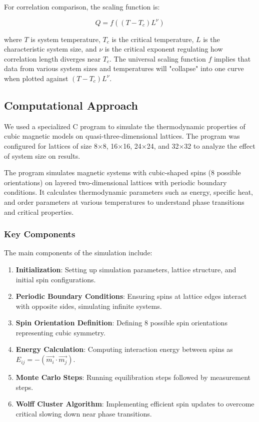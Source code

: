 \documentclass[conference, compsoc, twoside]{IEEEtran}
\begin{document}
For correlation comparison, the scaling function is:

\begin{equation}
Q = f((T - T_c)L^\nu)
\label{eq:correlation}
\end{equation}

where $T$ is system temperature, $T_c$ is the critical temperature, $L$ is the characteristic system size, and $\nu$ is the critical exponent regulating how correlation length diverges near $T_c$. The universal scaling function $f$ implies that data from various system sizes and temperatures will "collapse" into one curve when plotted against $(T - T_c)L^\nu$.

\subsection{Computational Approach}

We used a specialized C program to simulate the thermodynamic properties of cubic magnetic models on quasi-three-dimensional lattices. The program was configured for lattices of size 8×8, 16×16, 24×24, and 32×32 to analyze the effect of system size on results.

The program simulates magnetic systems with cubic-shaped spins (8 possible orientations) on layered two-dimensional lattices with periodic boundary conditions. It calculates thermodynamic parameters such as energy, specific heat, and order parameters at various temperatures to understand phase transitions and critical properties.

\subsubsection{Key Components}

The main components of the simulation include:

\begin{enumerate}
\item \textbf{Initialization}: Setting up simulation parameters, lattice structure, and initial spin configurations.
\item \textbf{Periodic Boundary Conditions}: Ensuring spins at lattice edges interact with opposite sides, simulating infinite systems.
\item \textbf{Spin Orientation Definition}: Defining 8 possible spin orientations representing cubic symmetry.
\item \textbf{Energy Calculation}: Computing interaction energy between spins as $E_{ij} = -(\vec{m_i} \cdot \vec{m_j})$.
\item \textbf{Monte Carlo Steps}: Running equilibration steps followed by measurement steps.
\item \textbf{Wolff Cluster Algorithm}: Implementing efficient spin updates to overcome critical slowing down near phase transitions.
\end{enumerate}
\end{document}
